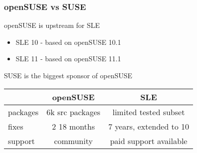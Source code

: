 \documentclass{beamer}
\begin{document}
\begin{frame}[t]
\frametitle{openSUSE vs SUSE}

openSUSE is upstream for SLE

\begin{itemize}
\item SLE 10 - based on openSUSE 10.1
\item SLE 11 - based on openSUSE 11.1
\end{itemize}

SUSE is the biggest sponsor of openSUSE

\vspace{.5cm}

\begin{tabular}{l|c|c}
& openSUSE & SLE\\
\hline
packages & 6k src packages & limited tested subset\\
fixes & 2 18 months & 7 years, extended to 10\\
support & community & paid support available
\end{tabular}

\end{frame}
\end{document}
